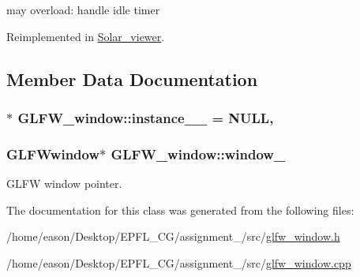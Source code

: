 may overload\+: handle idle timer 



Reimplemented in \hyperlink{classSolar__viewer_a1b9915ee3f62232328c7326753c11101}{Solar\+\_\+viewer}.



\subsection{Member Data Documentation}
\subsubsection[{\texorpdfstring{instance\+\_\+\+\_\+}{instance__}}]{ $\ast$ G\+L\+F\+W\+\_\+window\+::instance\+\_\+\+\_\+ = N\+U\+LL\hspace{0.3cm}{\ttfamily [static]}, {\ttfamily [private]}}\hypertarget{classGLFW__window_ac19dc5a7b2b03de75b34fdec1f472d31}{}\label{classGLFW__window_ac19dc5a7b2b03de75b34fdec1f472d31}
\subsubsection[{\texorpdfstring{window\+\_\+}{window_}}]{\setlength{\rightskip}{0pt plus 5cm}G\+L\+F\+Wwindow$\ast$ G\+L\+F\+W\+\_\+window\+::window\+\_\+\hspace{0.3cm}{\ttfamily [protected]}}\hypertarget{classGLFW__window_aa4396bd9557a5476690132bf6a0efcdf}{}\label{classGLFW__window_aa4396bd9557a5476690132bf6a0efcdf}


G\+L\+FW window pointer. 



The documentation for this class was generated from the following files\+:\begin{DoxyCompactItemize}
\item 
/home/eason/\+Desktop/\+E\+P\+F\+L\+\_\+\+C\+G/assignment\+\_/src/\hyperlink{glfw__window_8h}{glfw\+\_\+window.\+h}\item 
/home/eason/\+Desktop/\+E\+P\+F\+L\+\_\+\+C\+G/assignment\+\_/src/\hyperlink{glfw__window_8cpp}{glfw\+\_\+window.\+cpp}\end{DoxyCompactItemize}
